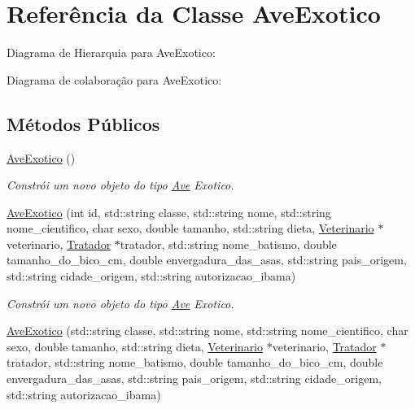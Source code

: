 \hypertarget{classAveExotico}{}\section{Referência da Classe Ave\+Exotico}
\label{classAveExotico}


Diagrama de Hierarquia para Ave\+Exotico\+:


Diagrama de colaboração para Ave\+Exotico\+:
\subsection*{Métodos Públicos}
\begin{DoxyCompactItemize}
\item 
\mbox{\label{classAveExotico_a60dd1f5a623f3b9215d7b3d6be44a525}} 
\hyperlink{classAveExotico_a60dd1f5a623f3b9215d7b3d6be44a525}{Ave\+Exotico} ()
\begin{DoxyCompactList}\small\item\em Constrói um novo objeto do tipo \hyperlink{classAve}{Ave} Exotico. \end{DoxyCompactList}\item 
\hyperlink{classAveExotico_a4bc404b26f0b3dc4025bc7c9ec5cedd3}{Ave\+Exotico} (int id, std\+::string classe, std\+::string nome, std\+::string nome\+\_\+cientifico, char sexo, double tamanho, std\+::string dieta, \hyperlink{classVeterinario}{Veterinario} $\ast$veterinario, \hyperlink{classTratador}{Tratador} $\ast$tratador, std\+::string nome\+\_\+batismo, double tamanho\+\_\+do\+\_\+bico\+\_\+cm, double envergadura\+\_\+das\+\_\+asas, std\+::string pais\+\_\+origem, std\+::string cidade\+\_\+origem, std\+::string autorizacao\+\_\+ibama)
\begin{DoxyCompactList}\small\item\em Constrói um novo objeto do tipo \hyperlink{classAve}{Ave} Exotico. \end{DoxyCompactList}\item 
\hyperlink{classAveExotico_afd7537696f757ff00283f78759b263b0}{Ave\+Exotico} (std\+::string classe, std\+::string nome, std\+::string nome\+\_\+cientifico, char sexo, double tamanho, std\+::string dieta, \hyperlink{classVeterinario}{Veterinario} $\ast$veterinario, \hyperlink{classTratador}{Tratador} $\ast$tratador, std\+::string nome\+\_\+batismo, double tamanho\+\_\+do\+\_\+bico\+\_\+cm, double envergadura\+\_\+das\+\_\+asas, std\+::string pais\+\_\+origem, std\+::string cidade\+\_\+origem, std\+::string autorizacao\+\_\+ibama)

\end{DoxyCompactItemize}
